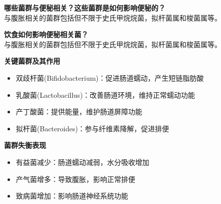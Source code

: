 \documentclass[UTF8]{ctexart}
\begin{document}
\begin{tcolorbox}[
    enhanced,
    colback=lightpurple!10, %
    colframe=lightpurple!10,  %
    arc=3mm,
    boxrule=0.5pt,
    width=\textwidth,
    top=8pt,
    bottom=8pt
]
{\small{\color{lightpurple}\faQuestionCircle}\quad \textbf{哪些菌群与便秘相关？这些菌群是如何影响便秘的？}\\
{\color{orange!50}\faComments}\quad 与腹胀相关的菌群包括但不限于史氏甲烷烷菌，拟杆菌属和梭菌属等。
}
\end{tcolorbox}

\begin{tcolorbox}[
    enhanced,
    colback=lightpurple!10, %
    colframe=lightpurple!10,  %
    arc=3mm,
    boxrule=0.5pt,
    width=\textwidth,
    top=8pt,
    bottom=8pt
]
{\small{\color{lightpurple}\faQuestionCircle}\quad \textbf{饮食如何影响便秘相关菌？}\\
{\color{orange!50}\faComments}\quad 与腹胀相关的菌群包括但不限于史氏甲烷烷菌，拟杆菌属和梭菌属等。
}
\end{tcolorbox}

\textbf{关键菌群及其作用}
\begin{itemize}[]
\item 双歧杆菌(Bifidobacterium)：促进肠道蠕动，产生短链脂肪酸
\item 乳酸菌(Lactobacillus)：改善肠道环境，维持正常蠕动功能
\item 产丁酸菌：提供能量，维护肠道屏障功能
\item 拟杆菌(Bacteroides)：参与纤维素降解，促进排便
\end{itemize}

\textbf{菌群失衡表现}
\begin{itemize}[]
\item 有益菌减少：肠道蠕动减弱，水分吸收增加
\item 产气菌增多：导致腹胀，影响正常排便
\item 致病菌增加：影响肠道神经系统功能
\end{itemize}

\newpage
\end{document}

